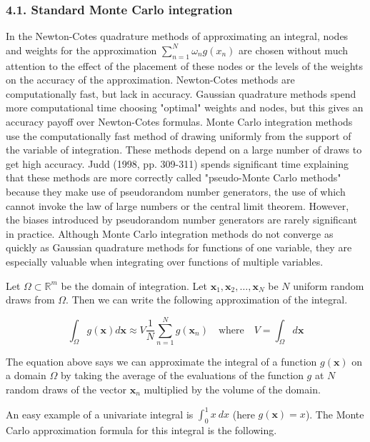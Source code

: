 \documentclass[11pt]{article}
\begin{document}
    \subsubsection{4.1. Standard Monte Carlo
integration}\label{standard-monte-carlo-integration}

In the Newton-Cotes quadrature methods of approximating an integral,
nodes and weights for the approximation \(\sum_{n=1}^N\omega_n g(x_n)\)
are chosen without much attention to the effect of the placement of
these nodes or the levels of the weights on the accuracy of the
approximation. Newton-Cotes methods are computationally fast, but lack
in accuracy. Gaussian quadrature methods spend more computational time
choosing "optimal" weights and nodes, but this gives an accuracy payoff
over Newton-Cotes formulas. Monte Carlo integration methods use the
computationally fast method of drawing uniformly from the support of the
variable of integration. These methods depend on a large number of draws
to get high accuracy. Judd (1998, pp. 309-311) spends significant time
explaining that these methods are more correctly called "pseudo-Monte
Carlo methods" because they make use of pseudorandom number generators,
the use of which cannot invoke the law of large numbers or the central
limit theorem. However, the biases introduced by pseudorandom number
generators are rarely significant in practice. Although Monte Carlo
integration methods do not converge as quickly as Gaussian quadrature
methods for functions of one variable, they are especially valuable when
integrating over functions of multiple variables.

Let \(\Omega\subset\mathbb{R}^m\) be the domain of integration. Let
\(\mathbf{x}_1, \mathbf{x}_2, \ldots, \mathbf{x}_N\) be \(N\) uniform
random draws from \(\Omega\). Then we can write the following
approximation of the integral.

\begin{equation}\label{EqMontoCarloIntGen}
  \int_\Omega g(\mathbf{x})d\mathbf{x}\approx V\frac{1}{N}\sum_{n=1}^N g\left(\mathbf{x}_n\right) \quad\text{where}\quad V = \int_\Omega d\mathbf{x}
\end{equation}

The equation above says we can approximate the integral of a function
\(g(\mathbf{x})\) on a domain \(\Omega\) by taking the average of the
evaluations of the function \(g\) at \(N\) random draws of the vector
\(\mathbf{x}_n\) multiplied by the volume of the domain.

An easy example of a univariate integral is \(\int_0^1 x\: dx\) (here
\(g(\mathbf{x}) = x\)). The Monte Carlo approximation formula for this
integral is the following.
\end{document}
